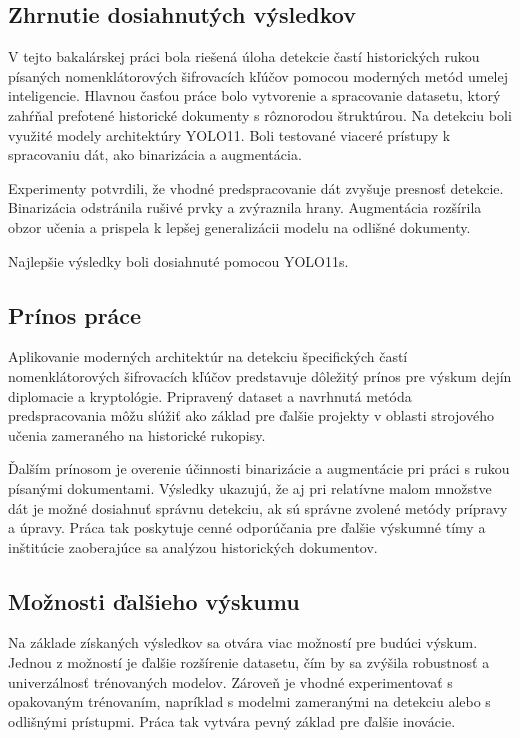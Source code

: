 \subsection*{Zhrnutie dosiahnutých výsledkov}

V tejto bakalárskej práci bola riešená úloha detekcie častí historických rukou písaných nomenklátorových šifrovacích kľúčov pomocou moderných metód umelej inteligencie. Hlavnou časťou práce bolo vytvorenie a spracovanie datasetu, ktorý zahŕňal prefotené historické dokumenty s rôznorodou štruktúrou. Na detekciu boli využité modely architektúry YOLO11. Boli testované viaceré prístupy k spracovaniu dát, ako binarizácia a augmentácia.

Experimenty potvrdili, že vhodné predspracovanie dát zvyšuje presnosť detekcie. Binarizácia odstránila rušivé prvky a zvýraznila hrany. Augmentácia rozšírila obzor učenia a prispela k lepšej generalizácii modelu na odlišné dokumenty. 
    
Najlepšie výsledky boli dosiahnuté pomocou YOLO11s.

\subsection*{Prínos práce}
   
Aplikovanie moderných architektúr na detekciu špecifických častí nomenklátorových šifrovacích kľúčov predstavuje dôležitý prínos pre výskum dejín diplomacie a kryptológie. Pripravený dataset a navrhnutá metóda predspracovania môžu slúžiť ako základ pre ďalšie projekty v oblasti strojového učenia zameraného na historické rukopisy.

Ďalším prínosom je overenie účinnosti binarizácie a augmentácie pri práci s rukou písanými dokumentami. Výsledky ukazujú, že aj pri relatívne malom množstve dát je možné dosiahnuť správnu detekciu, ak sú správne zvolené metódy prípravy a úpravy. Práca tak poskytuje cenné odporúčania pre ďalšie výskumné tímy a inštitúcie zaoberajúce sa analýzou historických dokumentov.

\subsection*{Možnosti ďalšieho výskumu}

Na základe získaných výsledkov sa otvára viac možností pre budúci výskum. Jednou z možností je ďalšie rozšírenie datasetu, čím by sa zvýšila robustnosť a univerzálnosť trénovaných modelov. Zároveň je vhodné experimentovať s opakovaným trénovaním, napríklad s modelmi zameranými na detekciu alebo s odlišnými prístupmi. Práca tak vytvára pevný základ pre ďalšie inovácie.